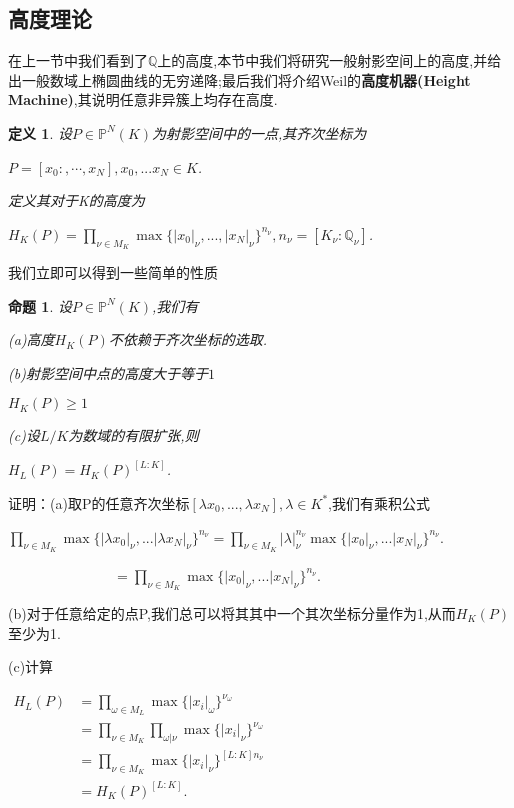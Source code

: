 \documentclass[11pt]{ctexart}
\DeclareMathOperator{\Max}{max}
\newtheorem{defi}{定义}[section]
\newtheorem{pro}{命题}[section]
\begin{document}
\subsection{高度理论}
在上一节中我们看到了$\mathbb{Q}$上的高度,本节中我们将研究一般射影空间上的高度,并给出一般数域上椭圆曲线的无穷递降;最后我们将介绍Weil的\textbf{高度机器(Height Machine)},其说明任意非异簇上均存在高度.
\begin{defi}设$P\in \mathbb{P}^N(K)$为射影空间中的一点,其齐次坐标为
    \begin{center}
        $P=[x_0:,\cdots,x_N],x_0,...x_N \in K$.
    \end{center}
定义其对于K的高度为
\begin{center}
    $H_K(P)=\prod\limits_{\nu \in M_K}\Max\{|x_0|_{\nu},...,|x_N|_{\nu}\}^{n_{\nu}} $$,n_{\nu}=[K_{\nu}:\mathbb{Q}_{\nu}]$.
\end{center}

\end{defi}
我们立即可以得到一些简单的性质
\begin{pro}设$P\in \mathbb{P}^N(K)$,我们有

    (a)高度$H_K(P)$不依赖于齐次坐标的选取.

    (b)射影空间中点的高度大于等于$1$
    \begin{center}
        $H_K(P)\geq 1$  
    \end{center}
    
    (c)设$L/K$为数域的有限扩张,则
     \begin{center}
        $H_L(P)=H_K(P)^{[L:K]}$.
     \end{center}

\end{pro}
\noindent 证明：(a)取P的任意齐次坐标$[\lambda x_0,...,\lambda x_N]$$,\lambda \in K^{*}$,我们有乘积公式
\begin{center}
    $\prod\limits_{\nu \in M_K}\Max\{|\lambda x_0|_{\nu},...|\lambda x_N|_{\nu}\}^{n_{\nu}} = \prod\limits_{\nu \in M_K} |\lambda|_{\nu}^{n_{\nu}}\Max\{|x_0|_{\nu},...|x_N|_{\nu}\}^{n_{\nu}}$.

    $~~~~~~~~~~~~~~~~~~~~~~~~~~~~~~~~~~=\prod\limits_{\nu \in M_K}\Max\{|x_0|_{\nu},...|x_N|_{\nu}\}^{n_{\nu}}$.
\end{center}

\noindent (b)对于任意给定的点P,我们总可以将其其中一个其次坐标分量作为1,从而$H_K(P)$至少为1.

\noindent (c)计算
\begin{center}
$\begin{array}{cl}
    H_L(P)&=\prod\limits_{\omega \in M_L}\Max\{|x_i|_{\omega}\}^{\nu_{\omega}} \\
    
    &=\prod\limits_{\nu \in M_K}\prod\limits_{\omega | \nu}\Max\{|x_i|_{\nu}\}^{\nu_{\omega}}\\
    
    &=\prod\limits_{\nu \in M_K}\Max\{|x_i|_{\nu}\}^{[L:K]n_{\nu}}\\
    
    &=H_K(P)^{[L:K]}.  
\end{array}$
\end{center}
 
\end{document}
